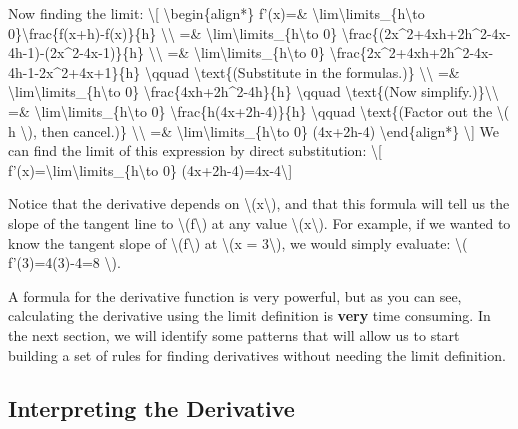Now finding the limit: \textbackslash{}{[}
\textbackslash{}begin\{align*\} f'(x)=\&
\textbackslash{}lim\textbackslash{}limits\_\{h\textbackslash{}to
0\}\textbackslash{}frac\{f(x+h)-f(x)\}\{h\}
\textbackslash{}\textbackslash{} =\&
\textbackslash{}lim\textbackslash{}limits\_\{h\textbackslash{}to 0\}
\textbackslash{}frac\{(2x\^{}2+4xh+2h\^{}2-4x-4h-1)-(2x\^{}2-4x-1)\}\{h\}
\textbackslash{}\textbackslash{} =\&
\textbackslash{}lim\textbackslash{}limits\_\{h\textbackslash{}to 0\}
\textbackslash{}frac\{2x\^{}2+4xh+2h\^{}2-4x-4h-1-2x\^{}2+4x+1\}\{h\}
\textbackslash{}qquad \textbackslash{}text\{(Substitute in the
formulas.)\} \textbackslash{}\textbackslash{} =\&
\textbackslash{}lim\textbackslash{}limits\_\{h\textbackslash{}to 0\}
\textbackslash{}frac\{4xh+2h\^{}2-4h\}\{h\} \textbackslash{}qquad
\textbackslash{}text\{(Now simplify.)\}\textbackslash{}\textbackslash{}
=\& \textbackslash{}lim\textbackslash{}limits\_\{h\textbackslash{}to 0\}
\textbackslash{}frac\{h(4x+2h-4)\}\{h\} \textbackslash{}qquad
\textbackslash{}text\{(Factor out the \textbackslash{}( h
\textbackslash{}), then cancel.)\} \textbackslash{}\textbackslash{} =\&
\textbackslash{}lim\textbackslash{}limits\_\{h\textbackslash{}to 0\}
(4x+2h-4) \textbackslash{}end\{align*\} \textbackslash{}{]} We can find
the limit of this expression by direct substitution: \textbackslash{}{[}
f'(x)=\textbackslash{}lim\textbackslash{}limits\_\{h\textbackslash{}to
0\} (4x+2h-4)=4x-4\textbackslash{}{]}

Notice that the derivative depends on
\textbackslash{}(x\textbackslash{}), and that this formula will tell us
the slope of the tangent line to \textbackslash{}(f\textbackslash{}) at
any value \textbackslash{}(x\textbackslash{}). For example, if we wanted
to know the tangent slope of \textbackslash{}(f\textbackslash{}) at
\textbackslash{}(x = 3\textbackslash{}), we would simply evaluate:
\textbackslash{}( f'(3)=4(3)-4=8 \textbackslash{}).

A formula for the derivative function is very powerful, but as you can
see, calculating the derivative using the limit definition is
\textbf{very} time consuming. In the next section, we will identify some
patterns that will allow us to start building a set of rules for finding
derivatives without needing the limit definition.

\hypertarget{interpreting-the-derivative}{%
\subsection{Interpreting the
Derivative}\label{interpreting-the-derivative}}

